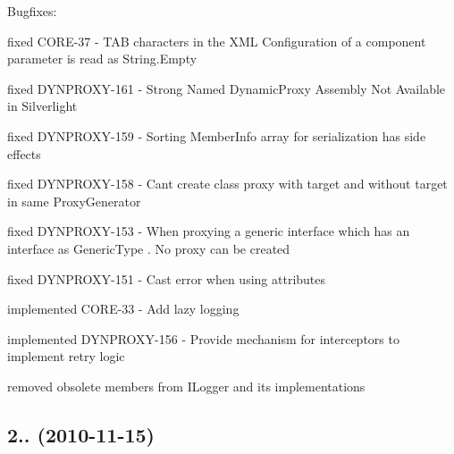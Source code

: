Bugfixes\+:
\begin{DoxyItemize}
\item fixed C\+O\+R\+E-\/37 -\/ T\+AB characters in the X\+ML Configuration of a component parameter is read as String.\+Empty
\item fixed D\+Y\+N\+P\+R\+O\+X\+Y-\/161 -\/ Strong Named Dynamic\+Proxy Assembly Not Available in Silverlight
\item fixed D\+Y\+N\+P\+R\+O\+X\+Y-\/159 -\/ Sorting Member\+Info array for serialization has side effects
\item fixed D\+Y\+N\+P\+R\+O\+X\+Y-\/158 -\/ Can\textquotesingle{}t create class proxy with target and without target in same Proxy\+Generator
\item fixed D\+Y\+N\+P\+R\+O\+X\+Y-\/153 -\/ When proxying a generic interface which has an interface as Generic\+Type . No proxy can be created
\item fixed D\+Y\+N\+P\+R\+O\+X\+Y-\/151 -\/ Cast error when using attributes
\item implemented C\+O\+R\+E-\/33 -\/ Add lazy logging
\item implemented D\+Y\+N\+P\+R\+O\+X\+Y-\/156 -\/ Provide mechanism for interceptors to implement retry logic
\item removed obsolete members from I\+Logger and its implementations
\end{DoxyItemize}

\subsection*{2.. (2010-\/11-\/15)}


